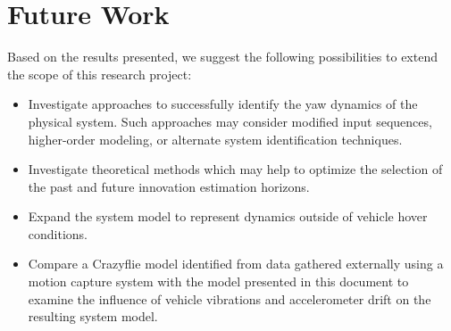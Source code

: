 \section{Future Work}
Based on the results presented, we suggest the following possibilities to extend the scope of this research project:
\begin{itemize}
\item Investigate approaches to successfully identify the yaw dynamics of the physical system. Such approaches may consider modified input sequences, higher-order modeling, or alternate system identification techniques. 
\item Investigate theoretical methods which may help to optimize the selection of the past and future innovation estimation horizons.
\item Expand the system model to represent dynamics outside of vehicle hover conditions.
\item Compare a Crazyflie model identified from data gathered externally using a motion capture system with the model presented in this document to examine the influence of vehicle vibrations and accelerometer drift on the resulting system model.
\end{itemize}


